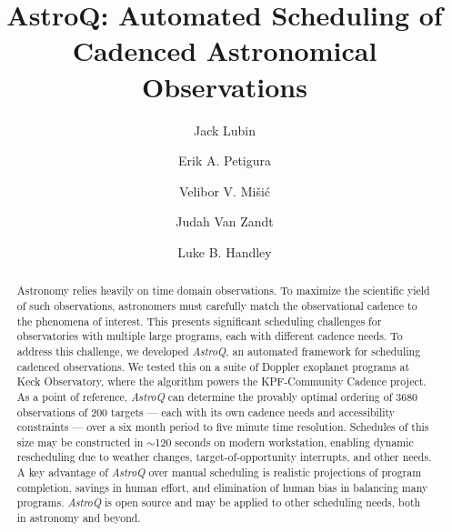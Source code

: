 \documentclass[twocolumn,linenumbers]{aastex63}
\newcommand{\AstroQ}{\textit{AstroQ}\xspace}
\begin{document}
\title{AstroQ: Automated Scheduling of Cadenced Astronomical Observations}

\author[0000-0001-8342-7736]{Jack Lubin}

\author[0000-0003-0967-2893]{Erik A. Petigura}

\author[[0000-0002-8952-5617]{Velibor V. Mi\v{s}i\'{c}}

\author[0000-0002-4290-6826]{Judah Van Zandt}

\author[0000-0002-9305-5101]{Luke B. Handley}

\begin{abstract}
Astronomy relies heavily on time domain observations. To maximize the scientific yield of such observations, astronomers must carefully match the observational cadence to the phenomena of interest. This presents significant scheduling challenges for observatories with multiple large programs, each with different cadence needs. To address this challenge, we developed \AstroQ, an automated framework for scheduling cadenced observations. We tested this on a suite of Doppler exoplanet programs at Keck Observatory, where the algorithm powers the KPF-Community Cadence project. As a point of reference, \AstroQ can determine the provably optimal ordering of 3680 observations of 200 targets --- each with its own cadence needs and accessibility constraints --- over a six month period to five minute time resolution. Schedules of this size may be constructed in $\sim$120 seconds on modern workstation, enabling dynamic rescheduling due to weather changes, target-of-opportunity interrupts, and other needs. A key advantage of \AstroQ over manual scheduling is realistic projections of program completion, savings in human effort, and elimination of human bias in balancing many programs. \AstroQ is open source and may be applied to other scheduling needs, both in astronomy and beyond. 
\end{abstract}
\end{document}
